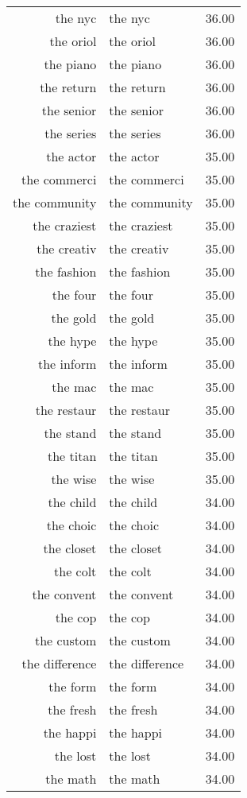 \begin{table}[ht]
\begin{tabular}{rlr}
  the nyc & the nyc & 36.00 \\ 
  the oriol & the oriol & 36.00 \\ 
  the piano & the piano & 36.00 \\ 
  the return & the return & 36.00 \\ 
  the senior & the senior & 36.00 \\ 
  the series & the series & 36.00 \\ 
  the actor & the actor & 35.00 \\ 
  the commerci & the commerci & 35.00 \\ 
  the community & the community & 35.00 \\ 
  the craziest & the craziest & 35.00 \\ 
  the creativ & the creativ & 35.00 \\ 
  the fashion & the fashion & 35.00 \\ 
  the four & the four & 35.00 \\ 
  the gold & the gold & 35.00 \\ 
  the hype & the hype & 35.00 \\ 
  the inform & the inform & 35.00 \\ 
  the mac & the mac & 35.00 \\ 
  the restaur & the restaur & 35.00 \\ 
  the stand & the stand & 35.00 \\ 
  the titan & the titan & 35.00 \\ 
  the wise & the wise & 35.00 \\ 
  the child & the child & 34.00 \\ 
  the choic & the choic & 34.00 \\ 
  the closet & the closet & 34.00 \\ 
  the colt & the colt & 34.00 \\ 
  the convent & the convent & 34.00 \\ 
  the cop & the cop & 34.00 \\ 
  the custom & the custom & 34.00 \\ 
  the difference & the difference & 34.00 \\ 
  the form & the form & 34.00 \\ 
  the fresh & the fresh & 34.00 \\ 
  the happi & the happi & 34.00 \\ 
  the lost & the lost & 34.00 \\ 
  the math & the math & 34.00 \\ 

\end{tabular}
\end{table}
